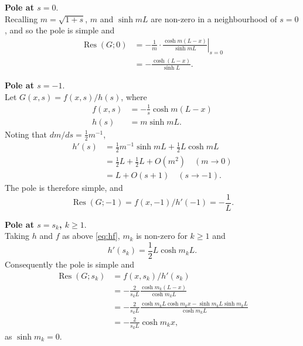 \documentclass[parskip=half]{scrartcl}
\DeclareMathOperator{\Res}{Res}
\begin{document}
\textbf{Pole at $s=0$}.\\
Recalling $m=\sqrt{1+s}$, $m$ and $\sinh mL$ are non-zero in
a neighbourhood of $s=0$, and so the pole is simple and
\begin{equation}
    \begin{aligned}
	\Res(G; 0) & = - \frac{1}{m}\cdot\left.\frac{\cosh m(L-x)}{\sinh mL}\right|_{s=0}\\
		   & = - \frac{\cosh (L-x)}{\sinh L}.
    \end{aligned}
\end{equation}

\textbf{Pole at $s=-1$}.\\
Let $G(x,s)=f(x,s)/h(s)$, where
\begin{equation}
    \begin{aligned}
        f(x, s) &= -\frac{1}{s}\cosh m(L-x)\\
        h(s) &= m\sinh mL.
    \end{aligned}
    \label{eq:hf}
\end{equation}
Noting that $dm/ds = \frac{1}{2}m^{-1}$,
\begin{equation}
    \begin{aligned}
	h'(s) &= \frac{1}{2}m^{-1}\sinh mL + \frac{1}{2}L\cosh mL \\
	      &= \frac{1}{2}L + \frac{1}{2}L + O(m^2) \quad(m\to 0) \\
	      &= L + O(s+1) \quad(s\to -1).
    \label{eq:hprime}
    \end{aligned}
\end{equation}
The pole is therefore simple, and
\begin{equation}
    \Res(G; -1) = f(x, -1)/h'(-1) = -\frac{1}{L}.
\end{equation}

\textbf{Pole at $s=s_k$, $k \geq 1$}.\\
Taking $h$ and $f$ as above \eqref{eq:hf},
$m_k$ is non-zero for $k\geq 1$ and
\[
    h'(s_k) = \frac{1}{2}L\cosh m_kL.
\]
Consequently the pole is simple and
\begin{equation}
    \begin{aligned}
	\Res(G; s_k)
	    & = f(x, s_k)/h'(s_k)\\
	    & =  -\frac{2}{s_k L}\frac{\cosh m_k(L-x)}{\cosh m_kL} \\
	    & =  -\frac{2}{s_k L}\frac{\cosh m_kL\cosh m_kx-\sinh m_kL\sinh m_kL}{\cosh m_kL} \\
	    & =  -\frac{2}{s_k L}\cosh m_k x,
    \end{aligned}
\end{equation}
as $\sinh m_k=0$.
\end{document}
